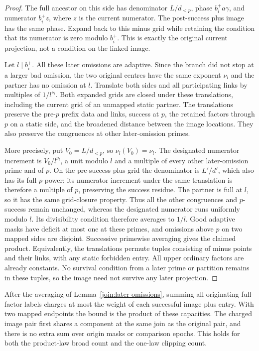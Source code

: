 \begin{proof}
The full ancestor on this side has denominator $L/d_{<p}$, phase
$b_i^+a\gamma$, and numerator $b_i^+z$, where $z$ is the current
numerator. The post-success plus image has the same phase. Expand back to
this minus grid while retaining the condition that its numerator is
zero modulo $b_i^+$. This is exactly the original current projection,
not a condition on the linked image.

Let $l\mid b_i^+$. All these later omissions are adaptive. Since the
branch did not stop at a larger bad omission, the two original centres
have the same exponent $\nu_l$ and the partner has no omission at $l$.
Translate both sides and all participating links by multiples of
$1/l^{\nu_l}$. Both expanded grids are closed under these
translations, including the current grid of an unmapped static
partner. The translations preserve the pre-$p$ prefix data and links,
success at $p$, the retained factors through $p$ on a static side,
and the broadened distance between the image locations. They also
preserve the congruences at other later-omission primes.

More precisely, put $V_0=L/d_{<p}$, so $\nu_l(V_0)=\nu_l$.
The designated numerator increment is $V_0/l^{\nu_l}$, a unit
modulo $l$ and a multiple of every other later-omission prime and
of $p$. On the pre-success plus grid the denominator is $L'/d'$,
which also has its full $p$-power; its numerator increment under
the same translation is therefore a multiple of $p$, preserving
the success residue. The partner is full at $l$, so it has the same
grid-closure property. Thus all the other congruences and $p$-success remain
unchanged, whereas the designated numerator runs uniformly modulo $l$. Its
divisibility condition therefore averages to $1/l$. Good adaptive
masks have deficit at most one at these primes, and omissions above
$p$ on two mapped sides are disjoint. Successive primewise averaging
gives the claimed product. Equivalently, the translations permute
tuples consisting of minus points and their links, with any static
forbidden entry. All upper ordinary factors are already constants.
No survival condition from a later prime or partition remains in
these tuples, so the image need not survive any later projection.
\end{proof}

\begin{lemma}
\label{join:capacity}
After the averaging of Lemma~\ref{join:later-omissions}, summing all
originating full-factor labels charges at most the weight of each
successful image plus entry. With two mapped endpoints the bound is
the product of these capacities. The charged image pair first shares
a component at the same join as the original pair, and there is no
extra sum over origin masks or comparison epochs. This holds for
both the product-law broad count and the one-law clipping count.
\end{lemma}

